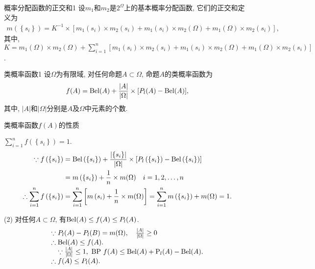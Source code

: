 \begin{mydef}{概率分配函数的正交和}{1}
设$m_1$和$m_2$是$2^\Omega$上的基本概率分配函数, 它们的正交和定义为
\begin{align}
    m\left(\left\{s_{i}\right\}\right)=K^{-1} \times\left[m_{1}\left(s_{i}\right) \times m_{2}\left(s_{i}\right)+m_{1}\left(s_{i}\right) \times m_{2}(\Omega)+m_{1}(\Omega) \times m_{2}\left(s_{i}\right)\right],
\end{align}
其中, $K=m_{1}(\Omega) \times m_{2}(\Omega)+\sum_{i=1}^{n}\left[m_{1}\left(s_{i}\right) \times m_{2}\left(s_{i}\right)+m_{1}\left(s_{i}\right) \times m_{2}(\Omega)+m_{1}(\Omega) \times m_{2}\left(s_{i}\right)\right]$.
\end{mydef}
\begin{mydef}{类概率函数}{1}
设$\Omega$为有限域, 对任何命题$A\subset \Omega$, 命题$A$的类概率函数为
\begin{align}
    f(A)=\textup{Bel}(A)+\frac{|A|}{|\Omega|} \times[P_l(A)-\textup{Bel}(A)],
\end{align}
其中, $|A|$和$|\Omega|$分别是$A$及$\Omega$中元素的个数.
\end{mydef}

类概率函数$f(A)$的性质

 $\sum_{i=1}^{n} f\left(\left\{s_{i}\right\}\right)=1$.
\begin{align*}
\because f\left(\left\{s_{i}\right\}\right) &=\textup{Bel}\left(\left\{s_{i}\right\}\right)+\frac{\left|\left\{s_{i}\right\}\right|}{|\Omega|} \times\left[P_l\left(\left\{s_{i}\right\}\right)-\textup{Bel}\left(\left\{s_{i}\right\}\right)\right] \notag\\
  &=m\left(\left\{s_{i}\right\}\right)+\frac{1}{n} \times m(\Omega) \quad i=1,2, \ldots, n \\
\therefore \sum_{i=1}^{n} f\left(\left\{s_{i}\right\}\right)
    &=\sum_{i=1}^{n}\left[m\left(s_{i}\right)+\frac{1}{n} \times m(\Omega)\right]
   =\sum_{i=1}^{n} m\left(\left\{s_{i}\right\}\right)+m(\Omega)=1.
\end{align*}

(2) 对任何$A\subset\Omega$, 有$\textup{Bel}(A)\leq f(A)\leq P_l(A)$.
\begin{align}
\begin{array}{l}
{\because P_l(A)-P_l(B)=m(\Omega), \quad \frac{|A|}{|\Omega|} \geq 0} \\
{\therefore \textup{Bel}(A) \leq f(A)}. \\
 {\quad \because \frac{|A|}{|\Omega|} \leq 1, \text { BP } f(A) \leq \textup{Bel}(A)+\textup{P}_l(A)-\textup{Bel}(A)}.\\
  \therefore f(A) \leq P_l(A).
  \end{array}
\end{align}

